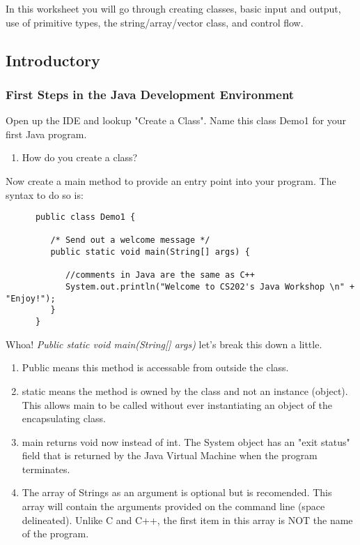 \documentclass[../../main.tex]{subfiles}
\begin{document}
In this worksheet you will go through creating classes, basic input and output,
use of primitive types, the string/array/vector class, and control flow.
\subsection{Introductory}
\subsubsection{First Steps in the Java Development Environment}
\begin{steps}
   \item Open up the IDE and lookup "Create a Class". Name this class Demo1 for your first Java program.
   \begin{enumerate}[label=\Alph*.]
   \item How do you create a class?
   \end{enumerate} 
   \item Now create a main method to provide an entry point into your program. The syntax to do so is: \\
      \begin{verbatim}
      public class Demo1 {

         /* Send out a welcome message */
         public static void main(String[] args) {

            //comments in Java are the same as C++
            System.out.println("Welcome to CS202's Java Workshop \n" + "Enjoy!");
         }
      }
\end{verbatim}
   Whoa! \emph{Public static void main(String[] args)} let's break this down a little.
   \begin{enumerate}[label=\Alph*.]
   \item Public means this method is accessable from outside the class.
   \item static means the method is owned by the class and not an instance (object). This allows main to be called without ever instantiating an object of the encapsulating class.
   \item main returns void now instead of int. The System object has an "exit status" field that is returned by the Java Virtual Machine when the program terminates.
   \item The array of Strings as an argument is optional but is recomended. This array will contain the arguments provided on the command line (space delineated). Unlike C and C++, the first item in this array is NOT the name of the program.
   \end{enumerate} 


\end{steps}
\end{document}
